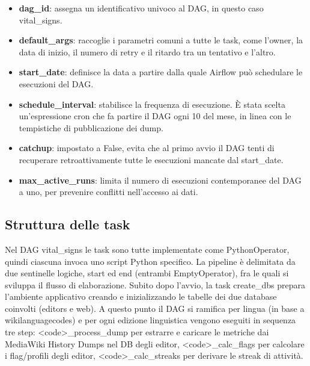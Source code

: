 \begin{itemize}
    \item \textbf{dag\_id}: assegna un identificativo univoco al DAG, in questo caso vital\_signs.
    \item \textbf{default\_args}: raccoglie i parametri comuni a tutte le task, come l'owner, la data di inizio, il numero di retry e il ritardo tra un tentativo e l'altro.
    \item \textbf{start\_date}: definisce la data a partire dalla quale Airflow può schedulare le esecuzioni del DAG.
    \item \textbf{schedule\_interval}: stabilisce la frequenza di esecuzione. È stata scelta un'espressione cron che fa partire il DAG ogni 10 del mese, in linea con le tempistiche di pubblicazione dei dump.
    \item \textbf{catchup}: impostato a False, evita che al primo avvio il DAG tenti di recuperare retroattivamente tutte le esecuzioni mancate dal start\_date.
    \item \textbf{max\_active\_runs}: limita il numero di esecuzioni contemporanee del DAG a uno, per prevenire conflitti nell'accesso ai dati.
\end{itemize}


\subsection{Struttura delle task}
\label{subsec:struttura_task}

Nel DAG vital\_signs le task sono tutte implementate come PythonOperator,
quindi ciascuna invoca uno script Python specifico.
La pipeline è delimitata da due sentinelle logiche, start ed end (entrambi EmptyOperator), fra le quali si sviluppa il flusso di elaborazione.
Subito dopo l’avvio, la task create\_dbs prepara l’ambiente applicativo creando e inizializzando le tabelle dei due database coinvolti (editors e web).
A questo punto il DAG si ramifica per lingua (in base a wikilanguagecodes) e per ogni edizione linguistica vengono eseguiti in sequenza tre step:
\textless code\textgreater\_process\_dump per estrarre e caricare le metriche dai MediaWiki History Dumps nel DB degli editor,
\textless code\textgreater\_calc\_flags per calcolare i flag/profili degli editor,
\textless code\textgreater\_calc\_streaks per derivare le streak di attività.

